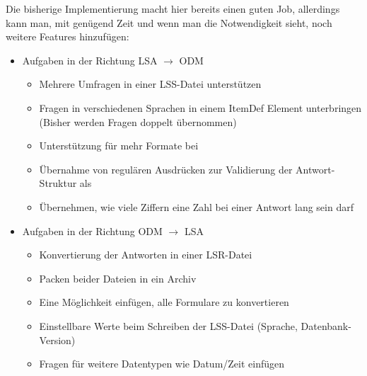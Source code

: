 Die bisherige Implementierung macht hier bereits einen guten Job, allerdings kann man, mit genügend Zeit und wenn man die Notwendigkeit sieht, noch weitere Features hinzufügen:
\begin{itemize}
	\item Aufgaben in der Richtung LSA $\rightarrow$ ODM
	\begin{itemize}
		\item Mehrere Umfragen in einer LSS-Datei unterstützen
		\item Fragen in verschiedenen Sprachen in einem ItemDef Element unterbringen (Bisher werden Fragen doppelt übernommen)
		\item Unterstützung für mehr Formate bei 
		\item Übernahme von regulären Ausdrücken zur Validierung der Antwort-Struktur als 
		\item Übernehmen, wie viele Ziffern eine Zahl bei einer Antwort lang sein darf
	\end{itemize}
	\item Aufgaben in der Richtung ODM $\rightarrow$ LSA
	\begin{itemize}
		\item Konvertierung der Antworten in einer LSR-Datei
		\item Packen beider Dateien in ein Archiv
		\item Eine Möglichkeit einfügen, alle Formulare zu konvertieren
		\item Einstellbare Werte beim Schreiben der LSS-Datei (Sprache, Datenbank-Version)
		\item Fragen für weitere Datentypen wie Datum/Zeit einfügen
	\end{itemize}
\end{itemize}
